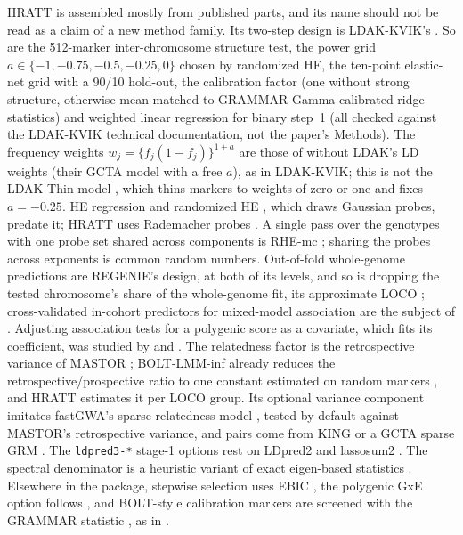 \documentclass[11pt]{article}
\newcommand{\code}[1]{\texttt{#1}}
\begin{document}
HRATT is assembled mostly from published parts, and its name should not be
read as a claim of a new method family. Its two-step design is LDAK-KVIK's
\citep{hof2025}. So are the 512-marker inter-chromosome structure test, the
power grid $a\in\{-1,-0.75,-0.5,-0.25,0\}$ chosen by randomized HE, the
ten-point elastic-net grid with a 90/10 hold-out, the calibration factor
(one without strong structure, otherwise mean-matched to
GRAMMAR-Gamma-calibrated ridge statistics) and weighted linear regression
for binary step~1 (all checked against the LDAK-KVIK technical
documentation, not the paper's Methods). The frequency weights $w_j=\{f_j(1-f_j)\}^{1+a}$ are those of
\citet{speed2017} without LDAK's LD weights \citep{speed2012} (their GCTA model with a free
$a$), as in LDAK-KVIK; this is not the LDAK-Thin model \citep{speed2020},
which thins markers to weights of zero or one and fixes $a=-0.25$. HE
regression \citep{haseman1972} and randomized HE \citep{wu2018}, which
draws Gaussian probes, predate it; HRATT uses Rademacher probes
\citep{hutchinson1990}. A single pass over the genotypes with one probe set
shared across components is RHE-mc \citep{pazokitoroudi2020}; sharing the
probes across exponents is common random numbers.
Out-of-fold whole-genome predictions are REGENIE's design, at both of its
levels, and so is dropping the tested chromosome's share of the
whole-genome fit, its approximate LOCO \citep{mbatchou2021};
cross-validated in-cohort predictors for mixed-model association are the
subject of \citet{mefford2020}. Adjusting association tests for a
polygenic score as a covariate, which fits its coefficient, was studied by
\citet{bennett2021} and \citet{campos2023}. The relatedness factor is the retrospective variance of MASTOR
\citep{jakobsdottir2013}; BOLT-LMM-inf already reduces the
retrospective/prospective ratio to one constant estimated on random markers
\citep{loh2015}, and HRATT estimates it per LOCO group. Its optional variance
component imitates fastGWA's sparse-relatedness model \citep{jiang2019},
tested by default against MASTOR's retrospective variance,
and pairs come from KING \citep{manichaikul2010} or a GCTA sparse GRM
\citep{yang2011}. The \code{ldpred3-*} stage-1 options rest on LDpred2
and lassosum2 \citep{prive2020,prive2022hgg}. The spectral denominator is a
heuristic variant of exact eigen-based statistics
\citep{kang2008,lippert2011,svishcheva2012}. Elsewhere in the package,
stepwise selection uses EBIC \citep{chen2008}, the polygenic GxE option
follows \citet{sul2016}, and BOLT-style calibration markers are screened with
the GRAMMAR statistic \citep{aulchenko2007}, as in \citet{loh2015}.
\end{document}
